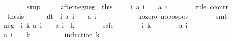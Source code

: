 \begin{isabellebody}
\ \ \ \ \ \ \isamarkupfalse%
\ simp\isanewline
\ \ \isacommand{{\isacharbraceright}}\isamarkupfalse%
\ \isamarkupfalse%
\ after{\isacharunderscore}neg{\isacharunderscore}neg\ {\isacharequal}\ this\isanewline
\isanewline
\ \ \isamarkupfalse%
\ {\isachardoublequoteopen}{\isasymexists}\ i{\isachardot}\ {\isacharquery}a\ i\ {\isacharless}\ {}\ {\isasymand}\ {\isacharquery}a\ {\isacharparenleft}i\ {\isacharplus}\ {}{\isacharparenright}\ {\isacharless}\ {}{\isachardoublequoteclose}\isanewline
\ \ \isamarkupfalse%
\ {\isacharparenleft}rule\ ccontr{\isacharparenright}\isanewline
\ \ \ \ \isamarkupfalse%
\ {\isachardoublequoteopen}{\isasymnot}\ {\isacharquery}thesis{\isachardoublequoteclose}\isanewline
\ \ \ \ \isamarkupfalse%
\ alt{\isacharcolon}\ {\isachardoublequoteopen}{\isasymforall}\ i{\isachardot}\ {\isacharquery}a\ i\ {\isacharless}\ {}\ {\isasymlongleftrightarrow}\ {\isacharquery}a\ {\isacharparenleft}i\ {\isacharplus}\ {}{\isacharparenright}\ {\isachargreater}\ {}{\isachardoublequoteclose}\isanewline
\ \ \ \ \ \ \isamarkupfalse%
\ no{\isacharunderscore}zero\ no{\isacharunderscore}pos{\isacharunderscore}pos\isanewline
\ \ \ \ \ \ \isamarkupfalse%
\ smt\isanewline
\isanewline
\ \ \ \ \isamarkupfalse%
\ neg{\isacharcolon}\ {\isachardoublequoteopen}{\isasymforall}\ i\ k{\isachardot}\ {\isacharquery}a\ i\ {\isacharless}\ {}\ {\isasymlongrightarrow}\ {\isacharquery}a\ {\isacharparenleft}i\ {\isacharplus}\ {}{\isacharasterisk}k{\isacharparenright}\ {\isacharless}\ {}{\isachardoublequoteclose}\isanewline
\ \ \ \ \isamarkupfalse%
\ safe\isanewline
\ \ \ \ \ \ \isamarkupfalse%
\ i\ k\isanewline
\ \ \ \ \ \ \isamarkupfalse%
\ {\isachardoublequoteopen}{\isacharquery}a\ i\ {\isacharless}\ {}{\isachardoublequoteclose}\isanewline
\ \ \ \ \ \ \isamarkupfalse%
\ \isamarkupfalse%
\ {\isachardoublequoteopen}{\isacharquery}a\ {\isacharparenleft}i\ {\isacharplus}\ {}\ {\isacharasterisk}\ k{\isacharparenright}\ {\isacharless}\ {}{\isachardoublequoteclose}\isanewline
\ \ \ \ \ \ \isamarkupfalse%
\ {\isacharparenleft}induction\ k{\isacharparenright}\isanewline
\ \ \ \ \ \ \ \ \isamarkupfalse%
\ {}\isanewline
\ \ \ \ \ \ \ \ \isamarkupfalse%

\end{isabellebody}
